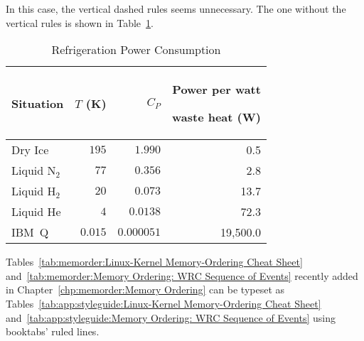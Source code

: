 In this case, the vertical dashed rules seems unnecessary.
The one without the vertical rules is shown in
Table~\ref{tab:app:styleguide:Refrigeration Power Consumption (arydshln-2)}.

\begin{table}[H]
\renewcommand*{\arraystretch}{1.2}\centering\small
\begin{tabular}{lrrr}\toprule
Situation
	& $T$ (K)
		& $C_P$	& \parbox[b]{.75in}{\raggedleft Power per watt\par waste heat (W)} \\
\midrule
Dry Ice
	& $195$
		& $1.990$
			& 0.5 \\ \hdashline
Liquid N$_2$
	& $77$
		& $0.356$
			& 2.8 \\ \hdashline
Liquid H$_2$
	& $20$
		& $0.073$
			& 13.7 \\ \hdashline
Liquid He
	& $4$
		& $0.0138$
			& 72.3 \\ \hdashline
IBM~Q	& $0.015$
		& $0.000051$
			& 19,500.0 \\
\bottomrule
\end{tabular}
\caption{Refrigeration Power Consumption}
\label{tab:app:styleguide:Refrigeration Power Consumption (arydshln-2)}
\end{table}

Tables~\ref{tab:memorder:Linux-Kernel Memory-Ordering Cheat Sheet}
and~\ref{tab:memorder:Memory Ordering: WRC Sequence of Events}
recently added in Chapter~\ref{chp:memorder:Memory Ordering}
can be typeset as
Tables~\ref{tab:app:styleguide:Linux-Kernel Memory-Ordering Cheat Sheet}
and~\ref{tab:app:styleguide:Memory Ordering: WRC Sequence of Events}
using booktabs' ruled lines.

